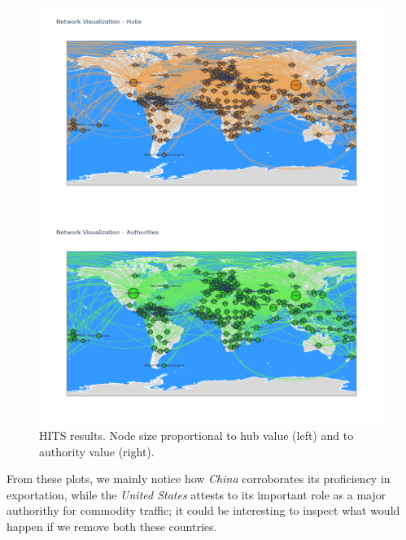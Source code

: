\documentclass[12pt, a4paper]{article}
\begin{document}
\begin{figure}[!ht]
\centering
\begin{minipage}[b]{0.49\textwidth}
    \centering
    \includegraphics[width=\textwidth]{figures/question4/figure_9_h1.png}
\end{minipage}
\hfill
\begin{minipage}[b]{0.49\textwidth}
    \centering
    \includegraphics[width=\textwidth]{figures/question4/figure_9_a1.png}
\end{minipage}
\captionsetup{font=scriptsize,labelfont=bf}
\caption{HITS results. Node size proportional to hub value (left) and to authority value (right).}
\label{fig:figure9}
\end{figure}

From these plots, we mainly notice how \textit{China} corroborates its proficiency in exportation, while the \textit{United States} attests to its important role as a major authorithy for commodity traffic; it could be interesting to inspect what would happen if we remove both these countries.
\end{document}
